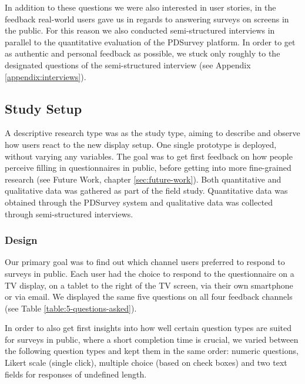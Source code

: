 	In addition to these questions we were also interested in user stories, in the feedback real-world users gave us in regards to answering surveys on screens in the public. For this reason we also conducted semi-structured interviews in parallel to the quantitative evaluation of the PDSurvey platform. In order to get as authentic and personal feedback as possible, we stuck only roughly to the designated questions of the semi-structured interview (see Appendix \ref{appendix:interviews}).




\subsection{Study Setup}

	A descriptive research type was as the study type, aiming to describe and observe how users react to the new display setup. One single prototype is deployed, without varying any variables. The goal was to get first feedback on how people perceive filling in questionnaires in public, before getting into more fine-grained research (see Future Work, chapter \ref{sec:future-work}). 
	Both quantitative and qualitative data was gathered as part of the field study. Quantitative data was obtained through the PDSurvey system and qualitative data was collected through semi-structured interviews.



	\subsubsection{Design}

	Our primary goal was to find out which channel users preferred to respond to surveys in public. Each user had the choice to respond to the questionnaire on a TV display, on a tablet to the right of the TV screen, via their own smartphone or via email. We displayed the same five questions on all four feedback channels (see Table \ref{table:5-questions-asked}).

	

	In order to also get first insights into how well certain question types are suited for surveys in public, where a short completion time is crucial, we varied between the following question types and kept them in the same order: numeric questions, Likert scale (single click), multiple choice (based on check boxes) and two text fields for responses of undefined length. 

